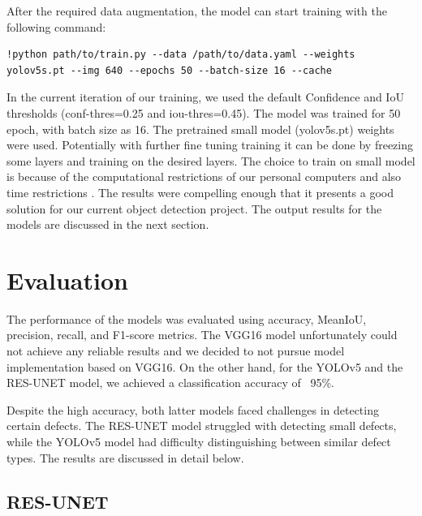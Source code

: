 \documentclass[12pt]{article}
\begin{document}
After the required data augmentation, the model can start training with the following command:

\begin{verbatim}
!python path/to/train.py --data /path/to/data.yaml --weights yolov5s.pt --img 640 --epochs 50 --batch-size 16 --cache
\end{verbatim}
In the current iteration of our training, we used the default Confidence and IoU thresholds (conf-thres=0.25 and iou-thres=0.45). The model was trained for 50 epoch, with batch size as 16. The pretrained small model (yolov5s.pt) weights were used. Potentially with further fine tuning training it can be done by freezing some layers and training on the desired layers. The choice to train on small model is because of the computational restrictions of our personal computers and also time restrictions \cite{YOLOv5GitHub}. The results were compelling enough that it presents a good solution for our current object detection project. The output results for the models are discussed in the next section.

\clearpage
\newpage

\section{Evaluation}

The performance of the models was evaluated using accuracy, MeanIoU, precision, recall, and F1-score metrics. The VGG16 model unfortunately could not achieve any reliable results and we decided to not pursue model implementation based on VGG16. On the other hand, for the YOLOv5 and the RES-UNET model, we achieved a classification accuracy of ~95\%. 

Despite the high accuracy, both latter models faced challenges in detecting certain defects. The RES-UNET model struggled with detecting small defects, while the YOLOv5 model had difficulty distinguishing between similar defect types. The results are discussed in detail below.

\subsection{RES-UNET}
\end{document}
